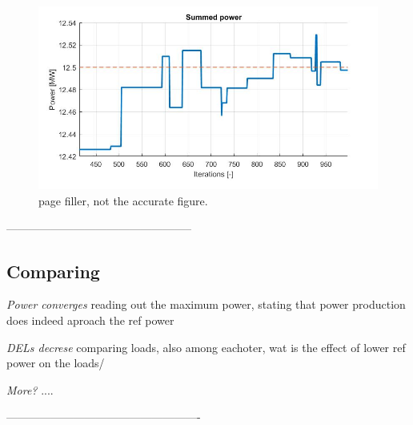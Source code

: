  \begin{figure}
 	\includegraphics[width=\linewidth]{./Figures/sumpowerexample.png}
 	\caption{page filler, not the accurate figure.}
 	\label{fig:case3power}
 \end{figure}
 
--------------------------------------------------
\subsection{Comparing}


\textit{Power converges}
	reading out the maximum power, stating that power production does indeed aproach the ref power
	
	
\textit{DELs decrese}
	comparing loads, also among eachoter, wat is the effect of lower ref power on the loads/
	
	
\textit{More?}   
 ....

  	
 
----------------------------------------------------   
         